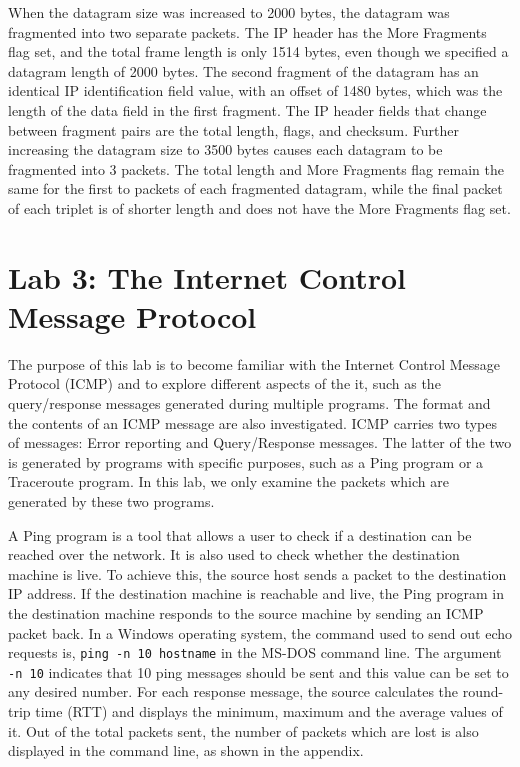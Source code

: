 \documentclass[10pt]{IEEEtran}
\begin{document}
 When the datagram size was increased to 2000 bytes, the datagram was fragmented into two separate packets. The IP header has the More Fragments flag set, and the total frame length is only 1514 bytes, even though we specified a datagram length of 2000 bytes. The second fragment of the datagram has an identical IP identification field value, with an offset of 1480 bytes, which was the length of the data field in the first fragment. The IP header fields that change between fragment pairs are the total length, flags, and checksum. Further increasing the datagram size to 3500 bytes causes each datagram to be fragmented into 3 packets. The total length and More Fragments flag remain the same for the first to packets of each fragmented datagram, while the final packet of each triplet is of shorter length and does not have the More Fragments flag set.\\
 
 
\section{Lab 3: The Internet Control Message Protocol}

 The purpose of this lab is to become familiar with the Internet Control Message Protocol (ICMP) and to explore different aspects of the it, such as the query/response messages generated during multiple programs. The format and the contents of an ICMP message are also investigated. ICMP carries two types of messages: Error reporting and Query/Response messages. The latter of the two is generated by programs with specific purposes, such as a Ping program or a Traceroute program. In this lab, we only examine the packets which are generated by these two programs.
 
 A Ping program is a tool that allows a user to check if a destination can be reached over the network. It is also used to check whether the destination machine is live. To achieve this, the source host sends a packet to the destination IP address. If the destination machine is reachable and live, the Ping program in the destination machine responds to the source machine by sending an ICMP packet back. In a Windows operating system, the command used to send out echo requests is, {\tt ping -n 10 hostname} in the MS-DOS command line. The argument {\tt -n 10} indicates that 10 ping messages should be sent and this value can be set to any desired number. For each response message, the source calculates the round-trip time (RTT) and displays the minimum, maximum and the average values of it. Out of the total packets sent, the number of packets which are lost is also displayed in the command line, as shown in the appendix. 
 
\end{document}
